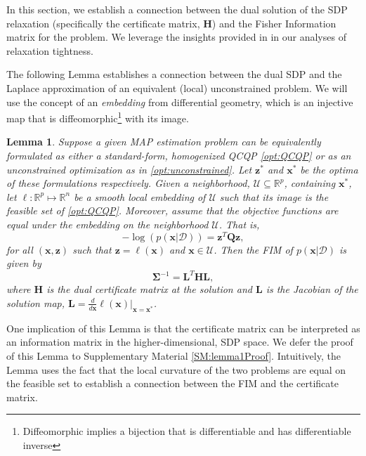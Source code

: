\documentclass[lettersize,journal]{IEEEtran}
\newtheorem{lemma}[theorem]{Lemma}
\begin{document}
{In this section, we establish a connection between the dual solution of the SDP relaxation (specifically the certificate matrix, $\bm{H}$) and the Fisher Information matrix for the problem. We leverage the insights provided in \cite{zhangDegeneracyOptimizationbasedState2016} in our analyses of relaxation tightness. 

The following Lemma establishes a connection between the dual SDP and the Laplace approximation of an equivalent (local) unconstrained problem. We will use the concept of an \emph{embedding} from differential geometry, which is an injective map that is diffeomorphic\footnote{Diffeomorphic implies a bijection that is differentiable and has differentiable inverse} with its image. 

\begin{lemma}\label{thm:FisherInfo}
	Suppose a given MAP estimation problem can be equivalently formulated as either a standard-form, homogenized QCQP \eqref{opt:QCQP} or as an unconstrained optimization as in \eqref{opt:unconstrained}. Let $\bm{z}^*$ and $\bm{x}^*$ be the optima of these formulations respectively. Given a neighborhood, $\mathcal{U} \subseteq \mathbb{R}^p$, containing $\bm{x}^*$, let $\bm{\ell}: \mathbb{R}^p \mapsto \mathbb{R}^n$ be a \emph{smooth local embedding} of $\mathcal{U}$ such that its image is the feasible set of \eqref{opt:QCQP}. Moreover, assume that the objective functions are equal under the embedding on the neighborhood $\mathcal{U}$. That is,
	\begin{equation}
		-\log\left(p(\bm{x} \vert \bm{\mathcal{D}})\right) = \bm{z}^T \bm{Q} \bm{z},
	\end{equation}
	for all $(\bm{x}, \bm{z})$ such that $\bm{z}=\mathbb{\ell}(\bm{x})$ and $\bm{x} \in \mathcal{U}$. Then the FIM of $p(\bm{x} \vert \bm{\mathcal{D}})$ is given by
	\begin{equation}
		\bm{\Sigma}^{-1}= \bm{L}^T \bm{H}\bm{L},
	\end{equation}
	where $\bm{H}$ is the dual certificate matrix at the solution and $\bm{L}$ is the Jacobian of the solution map, $\bm{L} = \frac{d}{d\bm{x}}\bm{\ell}(\bm{x})\vert_{\bm{x}=\bm{x}^*}$. 
\end{lemma}

One implication of this Lemma is that the certificate matrix can be interpreted as an information matrix in the higher-dimensional, SDP space. We defer the proof of this Lemma to Supplementary Material \ref{SM:lemma1Proof}. Intuitively, the Lemma uses the fact that the local curvature of the two problems are equal on the feasible set to establish a connection between the FIM and the certificate matrix. 

}
\end{document}
